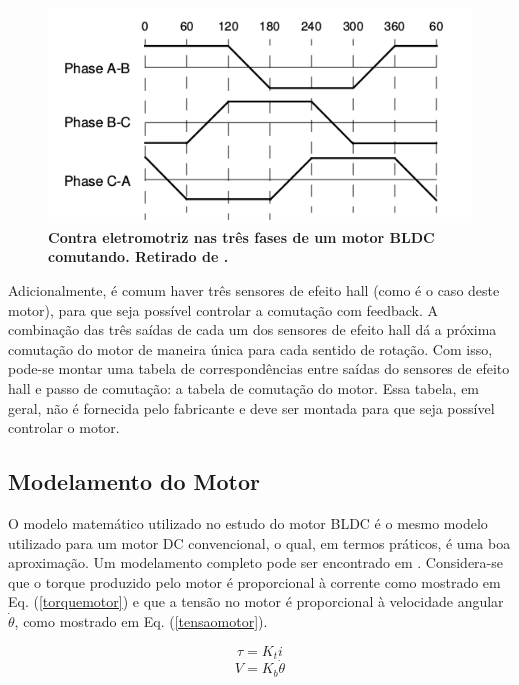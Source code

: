 \documentclass[10pt,fleqn,a4paper]{article}
\begin{document}
	\begin{figure}[ht]
		\begin{center}
			\includegraphics[angle=0, scale=0.5]{images/comutacao}
		\end{center}
		\caption{\textbf{Contra eletromotriz nas três fases de um motor BLDC comutando. Retirado de \cite{introducaobldc}.}}
		\label{fig:comutacao}
	\end{figure}
    
    
    Adicionalmente, é comum haver três sensores de efeito hall (como é o caso deste motor), para que seja possível controlar a comutação com feedback. A combinação das três saídas de cada um dos sensores de efeito hall dá a próxima comutação do motor de maneira única para cada sentido de rotação. Com isso, pode-se montar uma tabela de correspondências entre saídas do sensores de efeito hall e passo de comutação: a tabela de comutação do motor. Essa tabela, em geral, não é fornecida pelo fabricante e deve ser montada para que seja possível controlar o motor.
    
    \subsection{Modelamento do Motor}
    
    O modelo matemático utilizado no estudo do motor BLDC é o mesmo modelo utilizado para um motor DC convencional, o qual, em termos práticos, é uma boa aproximação. Um modelamento completo pode ser encontrado em \cite{modelomotor}. Considera-se que o torque produzido pelo motor é proporcional à corrente como mostrado em Eq. (\ref{torquemotor}) e que a tensão no motor é proporcional à velocidade angular $\dot{\theta}$, como mostrado em Eq. (\ref{tensaomotor}).
    
    \begin{equation}
    \tau = K_ti \label{torquemotor}
    \end{equation}
    \begin{equation}
    V = K_b\dot{\theta} \label{tensaomotor}
    \end{equation}
    
\end{document}
